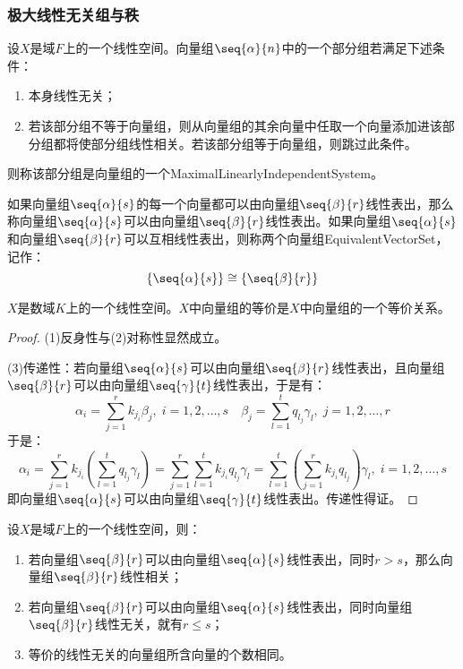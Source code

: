 \subsubsection{极大线性无关组与秩}
\begin{definition}
	设$X$是域$F$上的一个线性空间。向量组$\seq{\alpha}{n}$中的一个部分组若满足下述条件：
	\begin{enumerate}
		\item 本身线性无关；
		\item 若该部分组不等于向量组，则从向量组的其余向量中任取一个向量添加进该部分组都将使部分组线性相关。若该部分组等于向量组，则跳过此条件。
	\end{enumerate}
	则称该部分组是向量组的一个\gls{MaximalLinearlyIndependentSystem}。
\end{definition}
\begin{definition}
	如果向量组$\seq{\alpha}{s}$的每一个向量都可以由向量组$\seq{\beta}{r}$线性表出，那么称向量组$\seq{\alpha}{s}$可以由向量组$\seq{\beta}{r}$线性表出。如果向量组$\seq{\alpha}{s}$和向量组$\seq{\beta}{r}$可以互相线性表出，则称两个向量组\gls{EquivalentVectorSet}，记作：
	\begin{equation*}
		\{\seq{\alpha}{s}\}\cong\{\seq{\beta}{r}\}
	\end{equation*}
\end{definition}
\begin{theorem}
	$X$是数域$K$上的一个线性空间。$X$中向量组的等价是$X$中向量组的一个等价关系。
\end{theorem}
\begin{proof}
	(1)反身性与(2)对称性显然成立。\par
	(3)传递性：若向量组$\seq{\alpha}{s}$可以由向量组$\seq{\beta}{r}$线性表出，且向量组$\seq{\beta}{r}$可以由向量组$\seq{\gamma}{t}$线性表出，于是有：
	\begin{equation*}
		\alpha_i=\sum_{j=1}^{r}k_{j_i}\beta_j,\;i=1,2,\dots,s\quad
		\beta_j=\sum_{l=1}^{t}q_{l_j}\gamma_l,\;j=1,2,\dots,r
	\end{equation*}
	于是：
	\begin{equation*}
		\alpha_i=\sum_{j=1}^{r}k_{j_i}\left(\sum_{l=1}^{t}q_{l_j}\gamma_l\right)=\sum_{j=1}^{r}\sum_{l=1}^{t}k_{j_i}q_{l_j}\gamma_l=\sum_{l=1}^{t}\left(\sum_{j=1}^{r}k_{j_i}q_{l_j}\right)\gamma_l,\;i=1,2,\dots,s
	\end{equation*}
	即向量组$\seq{\alpha}{s}$可以由向量组$\seq{\gamma}{t}$线性表出。传递性得证。
\end{proof}
\begin{theorem}\label{theo:LinearlyIndependentNum}
	设$X$是域$F$上的一个线性空间，则：
	\begin{enumerate}
		\item 若向量组$\seq{\beta}{r}$可以由向量组$\seq{\alpha}{s}$线性表出，同时$r>s$，那么向量组$\seq{\beta}{r}$线性相关；
		\item 若向量组$\seq{\beta}{r}$可以由向量组$\seq{\alpha}{s}$线性表出，同时向量组$\seq{\beta}{r}$线性无关，就有$r\leqslant s$；
		\item 等价的线性无关的向量组所含向量的个数相同。
	\end{enumerate}
\end{theorem}
